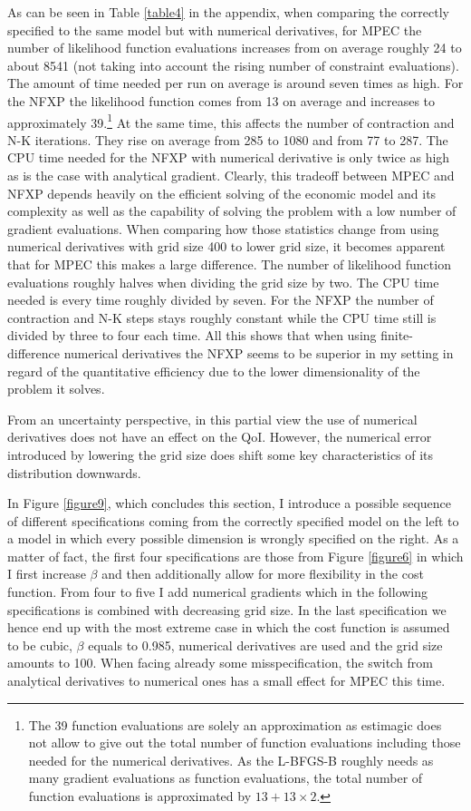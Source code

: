 As can be seen in Table \ref{table4} in the appendix, when comparing the correctly specified to the same model but with numerical derivatives, for MPEC the number of likelihood function evaluations increases from on average roughly 24 to about 8541 (not taking into account the rising number of constraint evaluations). The amount of time needed per run on average is around seven times as high. For the NFXP the likelihood function comes from 13 on average and increases to approximately 39.\footnote{ The 39 function evaluations are solely an approximation as estimagic does not allow to give out the total number of function evaluations including those needed for the numerical derivatives. As the L-BFGS-B roughly needs as many gradient evaluations as function evaluations, the total number of function evaluations is approximated by $13+13 \times 2$.} At the same time, this affects the number of contraction and N-K iterations. They rise on average from 285 to 1080 and from 77 to 287. The CPU time needed for the NFXP with numerical derivative is only twice as high as is the case with analytical gradient. Clearly, this tradeoff between MPEC and NFXP depends heavily on the efficient solving of the economic model and its complexity as well as the capability of solving the problem with a low number of gradient evaluations. When comparing how those statistics change from using numerical derivatives with grid size 400 to lower grid size, it becomes apparent that for MPEC this makes a large difference. The number of likelihood function evaluations roughly halves when dividing the grid size by two. The CPU time needed is every time roughly divided by seven. For the NFXP the number of contraction and N-K steps stays roughly constant while the CPU time still is divided by three to four each time. All this shows that when using finite-difference numerical derivatives the NFXP seems to be superior in my setting in regard of the quantitative efficiency due to the lower dimensionality of the problem it solves.

From an uncertainty perspective, in this partial view the use of numerical derivatives does not have an effect on the QoI. However, the numerical error introduced by lowering the grid size does shift some key characteristics of its distribution downwards.

In Figure \ref{figure9}, which concludes this section, I introduce a possible sequence of different specifications coming from the correctly specified model on the left to a model in which every possible dimension is wrongly specified on the right. As a matter of fact, the first four specifications are those from Figure \ref{figure6} in which I first increase $\beta$ and then additionally allow for more flexibility in the cost function. From four to five I add numerical gradients which in the following specifications is combined with decreasing grid size. In the last specification we hence end up with the most extreme case in which the cost function is assumed to be cubic, $\beta$ equals to 0.985, numerical derivatives are used and the grid size amounts to 100. When facing already some misspecification, the switch from analytical derivatives to numerical ones has a small effect for MPEC this time.

